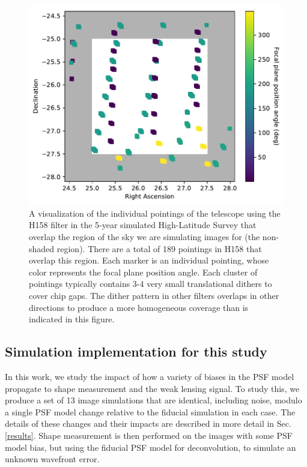 \documentclass[aps,prd, amsmath,amssymb,superscriptaddress,showkeys,nofootinbib,reprint,preprintnumbers]{revtex4-1}
\begin{document}
\begin{figure}
\begin{center}
\includegraphics[width=\columnwidth]{figures/pointings.pdf}
\end{center}
\caption[]{
A visualization of the individual pointings of the telescope using the H158 filter in the 5-year simulated High-Latitude Survey that overlap the region of the sky we are simulating images for (the non-shaded region). There are a total of 189 pointings in H158 that overlap this region. Each marker is an individual pointing, whose color represents the focal plane position angle. Each cluster of pointings typically contains 3-4 very small translational dithers to cover chip gaps. The dither pattern in other filters overlaps in other directions to produce a more homogeneous coverage than is indicated in this figure. 
\label{fig:pointings}}
\end{figure}

\subsection{Simulation implementation for this study}

In this work, we study the impact of how a variety of biases in the PSF model propagate to shape measurement and the weak lensing signal. 
To study this, we produce a set of 13 image simulations that are identical, including noise, modulo a single PSF model change relative to the fiducial simulation in each case. 
The details of these changes and their impacts are described in more detail in Sec. \ref{results}. 
Shape measurement is then performed on the images with some PSF model bias, but using the fiducial PSF model for deconvolution, to simulate an unknown wavefront error.
\end{document}
